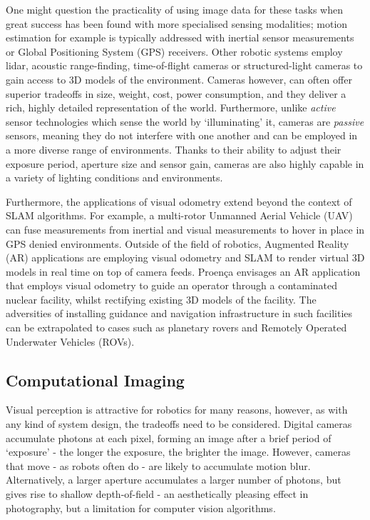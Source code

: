 One might question the practicality of using image data for these tasks when great success has been found with more specialised sensing modalities; motion estimation for example is typically addressed with inertial sensor measurements or Global Positioning System (GPS) receivers. Other robotic systems employ lidar, acoustic range-finding, time-of-flight cameras or structured-light cameras to gain access to 3D models of the environment. Cameras however, can often offer superior tradeoffs in size, weight, cost, power consumption, and they deliver a rich, highly detailed representation of the world. Furthermore, unlike \textit{active} sensor technologies which sense the world by `illuminating' it, cameras are \textit{passive} sensors, meaning they do not interfere with one another and can be employed in a more diverse range of environments. Thanks to their ability to adjust their exposure period, aperture size and sensor gain, cameras are also highly capable in a variety of lighting conditions and environments. 

Furthermore, the applications of visual odometry extend beyond the context of SLAM algorithms. For example, a multi-rotor Unmanned Aerial Vehicle (UAV) can fuse measurements from inertial and visual measurements to hover in place in GPS denied environments. Outside of the field of robotics, Augmented Reality (AR) applications are employing visual odometry and SLAM to render virtual 3D models in real time on top of camera feeds. Proença \cite{proenca2018rgbd} envisages an AR application that employs visual odometry to guide an operator through a contaminated nuclear facility, whilst rectifying existing 3D models of the facility. The adversities of installing guidance and navigation infrastructure in such facilities can be extrapolated to cases such as planetary rovers and Remotely Operated Underwater Vehicles (ROVs).


\subsection{Computational Imaging}

Visual perception is attractive for robotics for many reasons, however, as with any kind of system design, the tradeoffs need to be considered. Digital cameras accumulate photons at each pixel, forming an image after a brief period of `exposure' - the longer the exposure, the brighter the image. However, cameras that move - as robots often do - are likely to accumulate motion blur. Alternatively, a larger aperture accumulates a larger number of photons, but gives rise to shallow depth-of-field - an aesthetically pleasing effect in photography, but a limitation for computer vision algorithms. 


